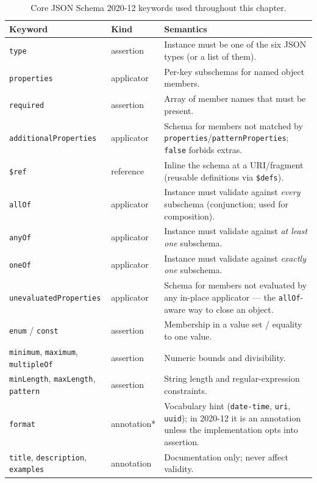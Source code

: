 \begin{table}[h]
  \centering
  \small
  \begin{tabularx}{\textwidth}{l l X}
    \toprule
    \textbf{Keyword} & \textbf{Kind} & \textbf{Semantics} \\
    \midrule
    \texttt{type} & assertion & Instance must be one of the six JSON types (or a list of them). \\
    \texttt{properties} & applicator & Per-key subschemas for named object members. \\
    \texttt{required} & assertion & Array of member names that must be present. \\
    \texttt{additionalProperties} & applicator & Schema for members not matched by \texttt{properties}/\texttt{patternProperties}; \texttt{false} forbids extras. \\
    \texttt{\$ref} & reference & Inline the schema at a URI/fragment (reusable definitions via \texttt{\$defs}). \\
    \texttt{allOf} & applicator & Instance must validate against \emph{every} subschema (conjunction; used for composition). \\
    \texttt{anyOf} & applicator & Instance must validate against \emph{at least one} subschema. \\
    \texttt{oneOf} & applicator & Instance must validate against \emph{exactly one} subschema. \\
    \texttt{unevaluatedProperties} & applicator & Schema for members not evaluated by any in-place applicator --- the \texttt{allOf}-aware way to close an object. \\
    \texttt{enum} / \texttt{const} & assertion & Membership in a value set / equality to one value. \\
    \texttt{minimum}, \texttt{maximum}, \texttt{multipleOf} & assertion & Numeric bounds and divisibility. \\
    \texttt{minLength}, \texttt{maxLength}, \texttt{pattern} & assertion & String length and regular-expression constraints. \\
    \texttt{format} & annotation* & Vocabulary hint (\texttt{date-time}, \texttt{uri}, \texttt{uuid}); in 2020-12 it is an annotation unless the implementation opts into assertion. \\
    \texttt{title}, \texttt{description}, \texttt{examples} & annotation & Documentation only; never affect validity. \\
    \bottomrule
  \end{tabularx}
  \caption{Core JSON Schema 2020-12 keywords used throughout this chapter.}
  \label{tab:ch4-jsonschema-keywords}
\end{table}


